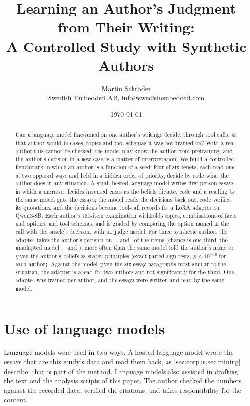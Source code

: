 \documentclass[10pt,a4paper]{article}
\title{Learning an Author's Judgment from Their Writing:\\
A Controlled Study with Synthetic Authors}
\author{Martin Schr\"oder\\
Swedish Embedded AB, \href{mailto:info@swedishembedded.com}{info@swedishembedded.com}}
\date{\today}
\begin{document}
\maketitle

\begin{abstract}
Can a language model fine-tuned on one author's writings decide, through tool calls, as that
author would in cases, topics and tool schemas it was not trained on? With a real author this
cannot be checked: the model may know the author from pretraining, and the author's decision in
a new case is a matter of interpretation. We build a controlled benchmark in which an author is
a function of a seed: four of six tenets, each read one of two opposed ways and held in a hidden
order of priority, decide by code what the author does in any situation. A small hosted
language model writes first-person essays in which a narrator decides invented cases as the
beliefs dictate; code and a reading by the same model gate the essays; the model reads the
decisions back out, code verifies its quotations, and the decisions become tool-call records
for a LoRA adapter on Qwen3-8B. Each author's 160-item examination withholds topics,
combinations of facts and options, and tool schemas, and is graded by comparing the option named
in the call with the oracle's decision, with no judge model. For three synthetic authors the
adapter takes the author's decision on \AccATuned, \AccBTuned\ and \AccCTuned\ of the items
(chance is one third; the unadapted model \AccABase, \AccBBase\ and \AccCBase), more often than
the same model told the author's name or given the author's beliefs as stated principles (exact
paired sign tests, $p<10^{-10}$ for each author). Against the model given the six essay
paragraphs most similar to the situation, the adapter is ahead for two authors and not
significantly for the third. One adapter was trained per author, and the essays were written
and read by the same model.
\end{abstract}











\section*{Use of language models}
Language models were used in two ways. A hosted language model wrote the essays that are this
study's data and read them back, as \cref{sec:corpus,sec:mining} describe; that is part of the
method. Language models also assisted in drafting the text and the analysis scripts of this
paper. The author checked the numbers against the recorded data, verified the citations, and
takes responsibility for the content.

\renewcommand{\bibfont}{\small}
\setlength{\bibsep}{2pt plus 1pt}



\appendix

\end{document}
